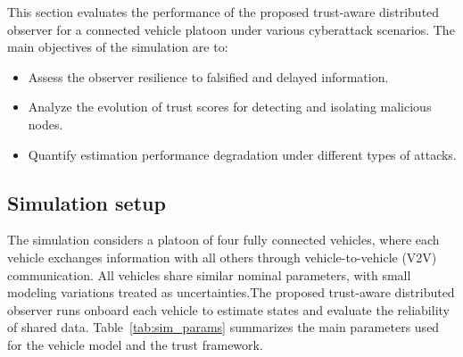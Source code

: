 \documentclass{ifacconf}
\begin{document}
This section evaluates the performance of the proposed trust-aware distributed observer for a connected vehicle platoon under various cyberattack scenarios. The main objectives of the simulation are to:
\begin{itemize}
    \item Assess the observer resilience to falsified and delayed information.
    \item Analyze the evolution of trust scores for detecting and isolating malicious nodes.
    \item Quantify estimation performance degradation under different types of attacks.
\end{itemize}


 











\vspace*{-0.3cm}
\subsection {Simulation setup}
\vspace*{-0.3cm}

The simulation considers a platoon of four fully connected vehicles, where each vehicle exchanges information with all others through vehicle-to-vehicle (V2V) communication. 
All vehicles share similar nominal parameters, with small modeling variations treated as uncertainties.The proposed trust-aware distributed observer runs onboard each vehicle to estimate states and evaluate the reliability of shared data. Table~\ref{tab:sim_params} summarizes the main parameters used for the vehicle model and the trust framework.
\end{document}

